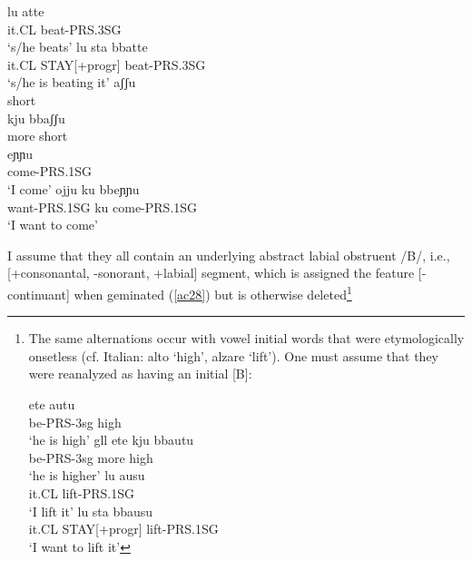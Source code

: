 \documentclass[output=paper]{langscibook}
\begin{document}
\ea\label{ac27}
    \ea\label{ac27a}
        \ea \label{ac27ai}\gll lu atte\\
            it.CL beat-PRS.3SG\\  
            \glt `s/he beats'  
        \ex \label{ac27aii}\gll lu   sta     bbatte\\
            it.CL STAY[+progr] beat-PRS.3SG\\
            \glt `s/he is beating it'
        \z
    \ex\label{ac27b}
        \ea \label{ac27bi}\gll aʃʃu\\
                short\\
        \ex \label{ac27bii}\gll kju     bbaʃʃu\\
                more    short\\
        \z
    \ex\label{ac27c}
        \ea \label{ac27ci}\gll eɲɲu\\
            come-PRS.1SG\\ 
            \glt `I come'   
        \ex \label{ac27cii}\gll ojju      ku   bbeɲɲu\\
            want-PRS.1SG ku   come-PRS.1SG\\
            \glt `I want to come' 
        \z
    \z
\z

I assume that they all contain an underlying abstract labial obstruent /B/, i.e., [+consonantal, -sonorant, +labial] segment, which is assigned the feature [-continuant] when geminated (\ref{ac28}) but is otherwise deleted\footnote{The same alternations occur with vowel initial words that were etymologically onsetless (cf. Italian: alto `high', alzare `lift').  One must assume that they were reanalyzed as having an initial [B]:

\ea \label{fn14ex}
    \ea \label{fn14exa}
        \ea \label{fn14exai}\gll ete autu\\
            be-PRS-3sg high\\
            \glt ‘he is high’    
        \ex \label{fn14exaii}gll ete kju bbautu\\
            be-PRS-3sg more high\\
            \glt ‘he is higher’
        \z
    \ex \label{fn14exb}
        \ea \label{fn14exbi}\gll lu ausu\\
            it.CL lift-PRS.1SG\\
            \glt ‘I lift it’  
        \ex \label{fn14exbii}\gll lu sta bbausu\\
            it.CL STAY[+progr]  lift-PRS.1SG\\
            \glt ‘I want to lift it’
        \z
    \z
\z

}
\end{document}
